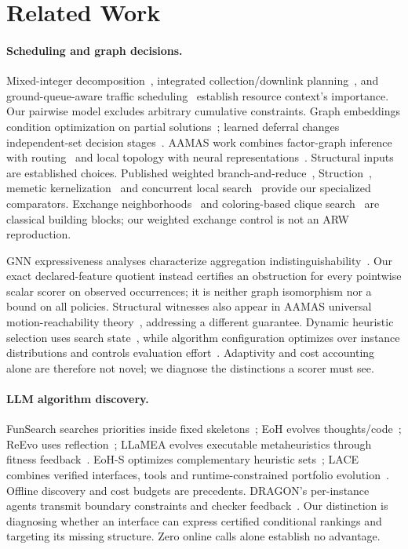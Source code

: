 \section{Related Work}
\label{sec:related}

\paragraph{Scheduling and graph decisions.}
Mixed-integer decomposition~\cite{augenstein2016optimal}, integrated
collection/downlink planning~\cite{levinson2025optimal}, and ground-queue-aware
traffic scheduling~\cite{tao2023transmitting} establish resource context's
importance. Our pairwise model excludes arbitrary cumulative constraints.
Graph embeddings condition optimization on partial
solutions~\cite{khalil2017learning}; learned deferral changes independent-set
decision stages~\cite{ahn2020defer}. AAMAS work combines factor-graph inference
with routing~\cite{li2024factor} and local topology with neural
representations~\cite{bai2025local}. Structural inputs are established choices.
Published weighted branch-and-reduce~\cite{lamm2019weighted},
Struction~\cite{gellner2021struction}, memetic
kernelization~\cite{grossmann2024mmwis} and concurrent local
search~\cite{grossmann2025chils} provide our specialized comparators.
Exchange neighborhoods~\cite{andrade2012local} and coloring-based clique
search~\cite{ostergard2002clique} are classical building blocks; our weighted
exchange control is not an ARW reproduction.

GNN expressiveness analyses characterize aggregation
indistinguishability~\cite{xu2019powerful,morris2019weisfeiler}. Our exact
declared-feature quotient instead certifies an obstruction for every
pointwise scalar scorer on observed occurrences; it is neither graph
isomorphism nor a bound on all policies. Structural witnesses also appear
in AAMAS universal motion-reachability theory~\cite{dhar2026universal},
addressing a different guarantee.
Dynamic heuristic selection uses search state~\cite{speck2021dynamic}, while
algorithm configuration optimizes over instance distributions and controls
evaluation effort~\cite{hutter2009paramils}. Adaptivity and cost accounting
alone are therefore not novel; we diagnose the distinctions a scorer must see.

\paragraph{LLM algorithm discovery.}
FunSearch searches priorities inside fixed skeletons~\cite{romeraparedes2024funsearch};
EoH evolves thoughts/code~\cite{liu2024eoh}; ReEvo uses
reflection~\cite{ye2024reevo}; LLaMEA evolves executable metaheuristics
through fitness feedback~\cite{vanstein2025llamea}. EoH-S optimizes complementary heuristic
sets~\cite{liu2026eohs}; LACE combines verified interfaces, tools and
runtime-constrained portfolio evolution~\cite{gong2026lace}. Offline discovery
and cost budgets are precedents. DRAGON's per-instance agents transmit
boundary constraints and checker feedback~\cite{chen2026dragon}. Our distinction
is diagnosing whether an interface can express certified conditional
rankings and targeting its missing structure. Zero online calls alone
establish no advantage.

